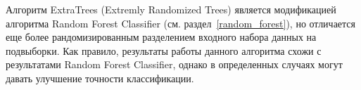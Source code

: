 Алгоритм ExtraTrees (Extremly Randomized Trees) является модификацией 
алгоритма Random Forest Classifier (см. раздел~\ref{random_forest}), но отличается еще более рандомизированным
разделением входного набора данных на подвыборки. Как правило, результаты работы данного алгоритма
схожи с результатами Random Forest Classifier, однако в определенных случаях могут давать улучшение
точности классификации.~\cite{extra_trees}

